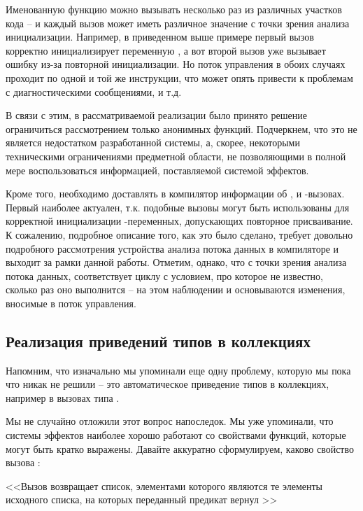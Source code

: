 Именованную функцию можно вызывать несколько раз из различных участков кода -- и каждый вызов может иметь различное значение с точки зрения анализа инициализации. Например, в приведенном выше примере первый вызов корректно инициализирует переменную , а вот второй вызов уже вызывает ошибку из-за повторной инициализации. Но поток управления в обоих случаях проходит по одной и той же инструкции, что может опять привести к проблемам с диагностическими сообщениями, и т.д.

В связи с этим, в рассматриваемой реализации было принято решение ограничиться рассмотрением только анонимных функций. Подчеркнем, что это не является недостатком разработанной системы, а, скорее, некоторыми техническими ограничениями предметной области, не позволяющими в полной мере воспользоваться информацией, поставляемой системой эффектов.

Кроме того, необходимо доставлять в компилятор информации об ,  и -вызовах. Первый наиболее актуален, т.к. подобные вызовы могут быть использованы для корректной инициализации -переменных, допускающих повторное присваивание. К сожалению, подробное описание того, как это было сделано, требует довольно подробного рассмотрения устройства анализа потока данных в компиляторе  и выходит за рамки данной работы. Отметим, однако, что с точки зрения анализа потока данных,  соответствует циклу  с условием, про которое не известно, сколько раз оно выполнится -- на этом наблюдении и основываются изменения, вносимые в поток управления.


\subsection{Реализация приведений типов в коллекциях}

Напомним, что изначально мы упоминали еще одну проблему, которую мы пока что никак не решили -- это автоматическое приведение типов в коллекциях, например в вызовах типа .

Мы не случайно отложили этот вопрос напоследок. Мы уже упоминали, что системы эффектов наиболее хорошо работают со свойствами функций, которые могут быть кратко выражены. Давайте аккуратно сформулируем, каково свойство вызова :

<<Вызов  возвращает список, элементами которого являются те элементы исходного списка, на которых переданный предикат вернул  >>

